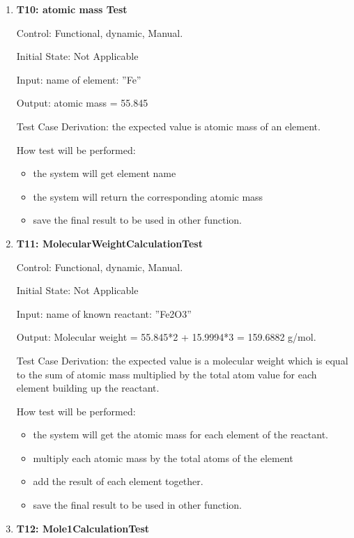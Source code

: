 \documentclass[12pt, titlepage]{article}
\begin{document}
\begin{enumerate}

\item{\bf T10: atomic mass Test\\}

Control: Functional, dynamic, Manual.
					
Initial State: Not Applicable
					
Input: name of element: ”Fe”
				
Output:  atomic mass = 55.845

Test Case Derivation: the expected value is atomic mass of an element.
					
How test will be performed: 
\begin{itemize}
\item the system will get element name
\item the system will return the corresponding atomic mass
\item save the final result to be used in other function.
\end{itemize}

\item{\bf T11: MolecularWeightCalculationTest\\}

Control: Functional, dynamic, Manual.
					
Initial State: Not Applicable
					
Input: name of known reactant: ”Fe2O3”
				
Output:  Molecular weight = 55.845*2 + 15.9994*3 =  159.6882 g/mol. 

Test Case Derivation: the expected value is a molecular weight which is equal to the sum of  atomic mass multiplied by the total atom value for each element building up the reactant. 
					
How test will be performed: 
\begin{itemize}
\item the system will get the atomic mass for each element of the reactant.
\item multiply each atomic mass by the total atoms of the element 
\item add the result of each element together.
\item save the final result to be used in other function.
\end{itemize}

\item{\bf T12: Mole1CalculationTest \\}


\end{enumerate}
\end{document}
